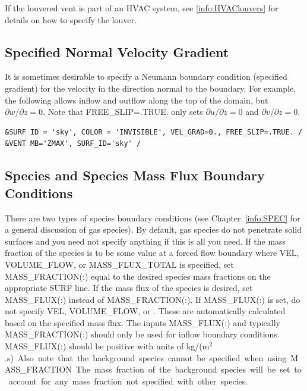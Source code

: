 \documentclass[11pt]{book}
\begin{document}
If the louvered vent is part of an HVAC system, see \ref{info:HVAClouvers} for details on how to specify the louver.


\subsection{Specified Normal Velocity Gradient}
\label{info:vel_grad}

It is sometimes desirable to specify a Neumann boundary condition (specified gradient) for the velocity in the direction normal to the boundary.  For example, the following allows inflow and outflow along the top of the domain, but $\partial w/\partial z = 0$.  Note that {\ct FREE\_SLIP=.TRUE.} only sets $\partial u/\partial z=0$ and $\partial v/\partial z=0$.
\begin{lstlisting}
&SURF ID = 'sky', COLOR = 'INVISIBLE', VEL_GRAD=0., FREE_SLIP=.TRUE. /
&VENT MB='ZMAX', SURF_ID='sky' /
\end{lstlisting}


\subsection{Species and Species Mass Flux Boundary Conditions}
\label{info:MASS_FLUX}

There are two types of species boundary conditions (see Chapter~\ref{info:SPEC} for a general discussion of gas species). By default, gas species do not penetrate solid surfaces and you need not specify anything if this is all you need. If the mass fraction of the species is to be some value at a forced flow boundary where {\ct VEL}, {\ct VOLUME\_FLOW}, or {\ct MASS\_FLUX\_TOTAL} is specified, set {\ct MASS\_FRACTION(:)} equal to the desired species mass fractions on the appropriate {\ct SURF} line. If the mass flux of the species is desired, set {\ct MASS\_FLUX(:)} instead of {\ct MASS\_FRACTION(:)}. If {\ct MASS\_FLUX(:)} is set, do not specify {\ct VEL}, {\ct VOLUME\_FLOW}, or . These are automatically calculated based on the specified mass flux. The inputs {\ct MASS\_FLUX(:)} and typically {\ct MASS\_FRACTION(:)} should only be used for inflow boundary conditions.  {\ct MASS\_FLUX(:)} should be positive with units of \si{kg/(m$^2$.s)}. Also note that the background species cannot be specified when using {\ct MASS\_FRACTION}.  The mass fraction of the background species will be set to account for any mass fraction not specified with other species.
\end{document}
